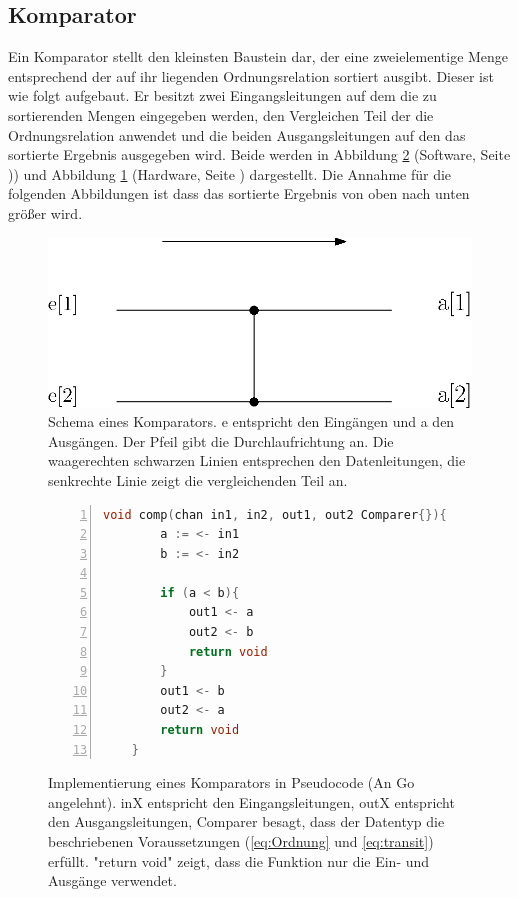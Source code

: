 \documentclass[11pt]{article}
\begin{document}
\subsection{Komparator}
Ein Komparator stellt den kleinsten Baustein dar, der eine zweielementige Menge entsprechend der auf ihr liegenden Ordnungsrelation sortiert ausgibt. Dieser ist wie folgt aufgebaut. Er besitzt zwei Eingangsleitungen auf dem die zu sortierenden Mengen eingegeben werden, den Vergleichen Teil der die Ordnungsrelation anwendet und die beiden Ausgangsleitungen auf den das sortierte Ergebnis ausgegeben wird. Beide werden in Abbildung \ref{fig:kompsoft} (Software, Seite \pageref{fig:kompsoft})) und Abbildung \ref{fig:komparator} (Hardware, Seite \pageref{fig:komparator}) dargestellt. Die Annahme für die folgenden Abbildungen ist dass das sortierte Ergebnis von oben nach unten größer wird.
\begin{figure}
\begin{center}
\includegraphics[scale=0.8]{Komparator1.eps}
\end{center}
\caption{Schema eines Komparators. e entspricht den Eingängen und a den Ausgängen. Der Pfeil gibt die Durchlaufrichtung an. Die waagerechten schwarzen Linien entsprechen den Datenleitungen, die senkrechte Linie zeigt die vergleichenden Teil an.}
\label{fig:komparator}
\end{figure}
\begin{figure}
\begin{lstlisting}[language=C,tabsize=4,numbers=left]
    void comp(chan in1, in2, out1, out2 Comparer{}){
        a := <- in1
        b := <- in2
        
        if (a < b){
            out1 <- a
            out2 <- b
            return void
        }
        out1 <- b
        out2 <- a
        return void
    }
\end{lstlisting}
\caption{Implementierung eines Komparators in Pseudocode (An Go angelehnt). inX entspricht den Eingangsleitungen, outX entspricht den Ausgangsleitungen, Comparer besagt, dass der Datentyp die beschriebenen Voraussetzungen (\eqref{eq:Ordnung} und \eqref{eq:transit}) erfüllt. "return void" zeigt, dass die Funktion nur die Ein- und Ausgänge verwendet.}
\label{fig:kompsoft}
\end{figure}
\FloatBarrier
\end{document}
